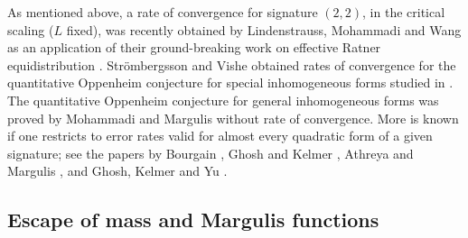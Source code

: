 \documentclass[12pt]{amsart}
\theoremstyle{definition}
\theoremstyle{remark}
\numberwithin{equation}{section}
\begin{document}
As mentioned above, a rate of convergence for signature $(2,2)$, in the critical scaling ($L$ fixed), was recently obtained by Lindenstrauss, Mohammadi and Wang \cite{LMW2023b} as an application of their ground-breaking work on effective Ratner equidistribution \cite{LMW2022,LMW2023a}. 
Str\"ombergsson and Vishe \cite{AV2020} obtained rates of convergence for the quantitative Oppenheim conjecture for special inhomogeneous forms studied in \cite{Marklof2002,Marklof2003}. The quantitative Oppenheim conjecture for general inhomogeneous forms was proved by Mohammadi and Margulis \cite{MargulisMohammadi2011} without rate of convergence. More is known if one restricts to error rates valid for almost every quadratic form of a given signature; see the papers by Bourgain \cite{Bourgain2016}, Ghosh and Kelmer \cite{GhoshKelmer2017,GhoshKelmer2018}, Athreya and Margulis \cite{AthMar2018}, and Ghosh, Kelmer and Yu \cite{GKY2022,GKY2023}.


\subsection{Escape of mass and Margulis functions}
\end{document}
